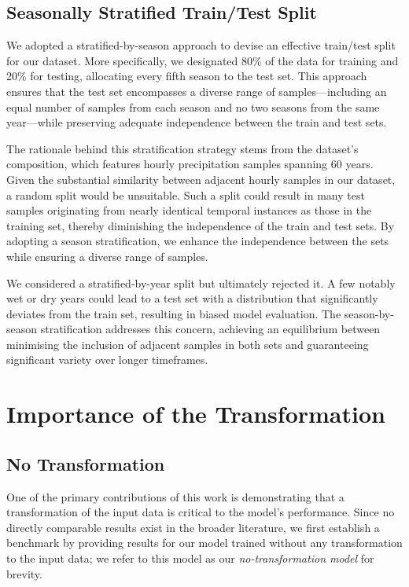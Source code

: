 \documentclass[ oneside,%
                    author={George Herbert},
                    degree={MSci},
                     title={Video Diffusion Models for Climate Simulations},
                  subtitle={}]{dissertation}
\begin{document}
\subsection{Seasonally Stratified Train/Test Split}
\label{sec:results_dataset_train_test}

We adopted a stratified-by-season approach to devise an effective train/test split for our dataset. More specifically, we designated 80\% of the data for training and 20\% for testing, allocating every fifth season to the test set. This approach ensures that the test set encompasses a diverse range of samples---including an equal number of samples from each season and no two seasons from the same year---while preserving adequate independence between the train and test sets.

The rationale behind this stratification strategy stems from the dataset's composition, which features hourly precipitation samples spanning 60 years. Given the substantial similarity between adjacent hourly samples in our dataset, a random split would be unsuitable. Such a split could result in many test samples originating from nearly identical temporal instances as those in the training set, thereby diminishing the independence of the train and test sets. By adopting a season stratification, we enhance the independence between the sets while ensuring a diverse range of samples.

We considered a stratified-by-year split but ultimately rejected it. A few notably wet or dry years could lead to a test set with a distribution that significantly deviates from the train set, resulting in biased model evaluation. The season-by-season stratification addresses this concern, achieving an equilibrium between minimising the inclusion of adjacent samples in both sets and guaranteeing significant variety over longer timeframes.

\section{Importance of the Transformation}
\label{sec:results_importance_of_transformation}

\subsection{No Transformation}
\label{sec:results_no_transformation}

One of the primary contributions of this work is demonstrating that a transformation of the input data is critical to the model's performance. Since no directly comparable results exist in the broader literature, we first establish a benchmark by providing results for our model trained without any transformation to the input data; we refer to this model as our \textit{no-transformation model} for brevity.
\end{document}
